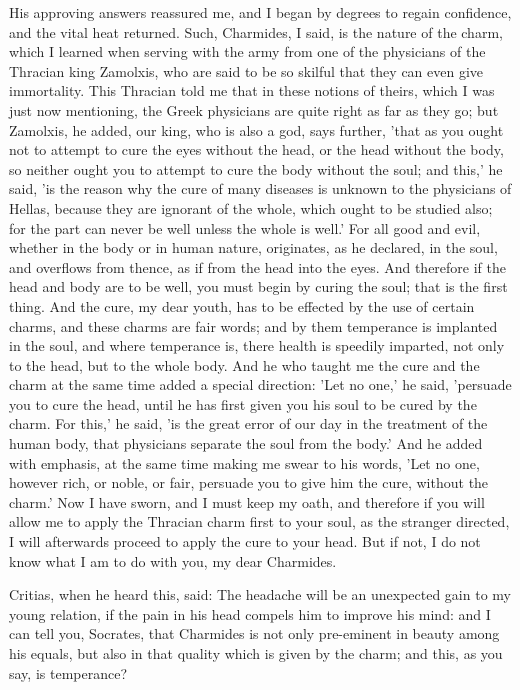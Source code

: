 \documentclass[11pt,letter]{article}
\begin{document}
\par  His approving answers reassured me, and I began by degrees to regain confidence, and the vital heat returned. Such, Charmides, I said, is the nature of the charm, which I learned when serving with the army from one of the physicians of the Thracian king Zamolxis, who are said to be so skilful that they can even give immortality. This Thracian told me that in these notions of theirs, which I was just now mentioning, the Greek physicians are quite right as far as they go; but Zamolxis, he added, our king, who is also a god, says further, 'that as you ought not to attempt to cure the eyes without the head, or the head without the body, so neither ought you to attempt to cure the body without the soul; and this,' he said, 'is the reason why the cure of many diseases is unknown to the physicians of Hellas, because they are ignorant of the whole, which ought to be studied also; for the part can never be well unless the whole is well.' For all good and evil, whether in the body or in human nature, originates, as he declared, in the soul, and overflows from thence, as if from the head into the eyes. And therefore if the head and body are to be well, you must begin by curing the soul; that is the first thing. And the cure, my dear youth, has to be effected by the use of certain charms, and these charms are fair words; and by them temperance is implanted in the soul, and where temperance is, there health is speedily imparted, not only to the head, but to the whole body. And he who taught me the cure and the charm at the same time added a special direction: 'Let no one,' he said, 'persuade you to cure the head, until he has first given you his soul to be cured by the charm. For this,' he said, 'is the great error of our day in the treatment of the human body, that physicians separate the soul from the body.' And he added with emphasis, at the same time making me swear to his words, 'Let no one, however rich, or noble, or fair, persuade you to give him the cure, without the charm.' Now I have sworn, and I must keep my oath, and therefore if you will allow me to apply the Thracian charm first to your soul, as the stranger directed, I will afterwards proceed to apply the cure to your head. But if not, I do not know what I am to do with you, my dear Charmides.

\par  Critias, when he heard this, said: The headache will be an unexpected gain to my young relation, if the pain in his head compels him to improve his mind: and I can tell you, Socrates, that Charmides is not only pre-eminent in beauty among his equals, but also in that quality which is given by the charm; and this, as you say, is temperance?
\end{document}
